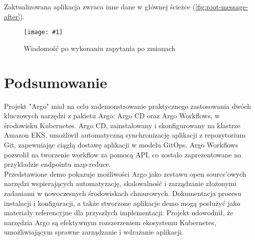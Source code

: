 \documentclass{article}
\newcommand{\img}[4]{
    \begin{figure}[!htbp]
    \centering
    \texttt{[image: \#1]}
    \caption{#2}
    \label{#3}
    \end{figure}
}
\begin{document}
\newpage
Zaktualizowana aplikacja zwraca inne dane w głównej ścieżce (\autoref{fig:root-message-after}).

\img{img/root_message_after.png}{Wiadomość po wykonaniu zapytania po zmianach}{fig:root-message-after}{0.9}


\section{Podsumowanie}
Projekt "Argo" miał na celu zademonstrowanie praktycznego zastosowania dwóch kluczowych narzędzi z pakietu Argo: Argo CD oraz Argo Workflows, w środowisku Kubernetes. Argo CD, zainstalowany i skonfigurowany na klastrze Amazon EKS, umożliwił automatyczną synchronizację aplikacji z repozytorium Git, zapewniając ciągłą dostawę aplikacji w modelu GitOps. Argo Workflows pozwolił na tworzenie workflow za pomocą API, co zostało zaprezentowane na przykładzie endpointu map-reduce. \\

Przedstawione demo pokazuje możliwości Argo jako zestawu open source'owych narzędzi wspierających automatyzację, skalowalność i zarządzanie złożonymi zadaniami w nowoczesnych środowiskach chmurowych. Dokumentacja procesu instalacji i konfiguracji, a także stworzone aplikacje demo mogą posłużyć jako materiały referencyjne dla przyszłych implementacji. Projekt udowodnił, że narzędzia Argo są efektywnym rozszerzeniem ekosystemu Kubernetes, umożliwiającym sprawne zarządzanie i wdrażanie aplikacji.


\newpage
\printbibliography[heading=bibintoc,title={Źródła}]
\end{document}
